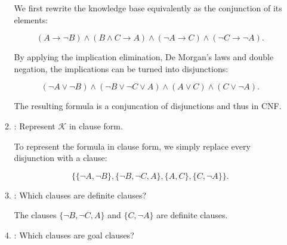\documentclass[solution]{acAssignment}
\begin{document}
\begin{enumerate}
\begin{enumerate}
                \begin{acSolution}
                    We first rewrite the knowledge base equivalently as the conjunction of its elements:
                    
                    \begin{equation}
                        (A \to \lnot B) \land (B \land C \to A) \land (\lnot A \to C) \land (\lnot C \to \lnot A).
                    \end{equation}
                    
                    By applying the implication elimination, De Morgan's laws and double negation, the implications can be turned into disjunctions:
                    
                    \begin{equation}
                        (\lnot A \lor \lnot B) \land (\lnot B \lor \lnot C \lor A) \land (A \lor C) \land (C \lor \lnot A).
                    \end{equation}
                    
                    The resulting formula is a conjuncation of disjunctions and thus in CNF.
                \end{acSolution}
            
            \item {}: Represent $\mathcal{K}$ in clause form.
            
                \begin{acSolution}
                    To represent the formula in clause form, we simply replace every disjunction with a clause:
                    
                    \begin{equation}
                        \big\{ \{\lnot A, \lnot B\}, \{\lnot B, \lnot C, A\}, \{A, C\}, \{C, \lnot A\} \big\}.
                    \end{equation}
                \end{acSolution}
            
            \item {}: Which clauses are definite clauses?
            
                \begin{acSolution}
                    The clauses $\{\lnot B, \lnot C, A\}$ and $\{C, \lnot A\}$ are definite clauses.
                \end{acSolution}
            
            \item {}: Which clauses are goal clauses?
            

\end{enumerate}
\end{enumerate}
\end{document}
